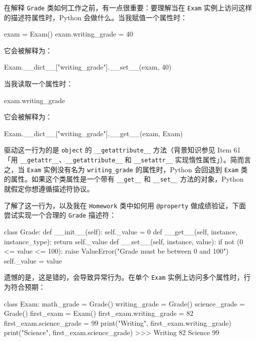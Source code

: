 在解释 \texttt{Grade} 类如何工作之前，有一点很重要：要理解当在 \texttt{Exam} 实例上访问这样的描述符属性时，Python 会做什么。当我赋值一个属性时：

\begin{codebox}[python]
exam = Exam()
exam.writing_grade = 40
\end{codebox}

它会被解释为：

\begin{codebox}[python]
Exam.__dict__["writing_grade"].__set__(exam, 40)
\end{codebox}

当我读取一个属性时：

\begin{codebox}[python]
exam.writing_grade
\end{codebox}

它会被解释为：

\begin{codebox}[python]
Exam.__dict__["writing_grade"].__get__(exam, Exam)
\end{codebox}

驱动这一行为的是 \texttt{object} 的 \texttt{\_\_getattribute\_\_} 方法（背景知识参见 Item 61「用 \texttt{\_\_getattr\_\_}、\texttt{\_\_getattribute\_\_} 和 \texttt{\_\_setattr\_\_} 实现惰性属性」）。简而言之，当 \texttt{Exam} 实例没有名为 \texttt{writing\_grade} 的属性时，Python 会回退到 \texttt{Exam} 类的属性。如果这个类属性是一个带有 \texttt{\_\_get\_\_} 和 \texttt{\_\_set\_\_} 方法的对象，Python 就假定你想遵循描述符协议。

了解了这一行为，以及我在 \texttt{Homework} 类中如何用 \texttt{@property} 做成绩验证，下面尝试实现一个合理的 \texttt{Grade} 描述符：

\begin{codebox}[python]
class Grade:
    def __init__(self):
        self._value = 0
    def __get__(self, instance, instance_type):
        return self._value
    def __set__(self, instance, value):
        if not (0 <= value <= 100):
            raise ValueError("Grade must be between 0 and 100")
        self._value = value
\end{codebox}

遗憾的是，这是错的，会导致异常行为。在单个 \texttt{Exam} 实例上访问多个属性时，行为符合预期：

\begin{codebox}[python]
class Exam:
    math_grade = Grade()
    writing_grade = Grade()
    science_grade = Grade()
first_exam = Exam()
first_exam.writing_grade = 82
first_exam.science_grade = 99
print("Writing", first_exam.writing_grade)
print("Science", first_exam.science_grade)
>>>
Writing 82
Science 99
\end{codebox}

